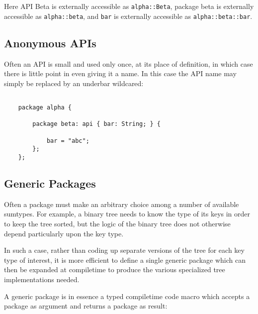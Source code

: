 Here API Beta is externally accessible as {\tt alpha::Beta}, 
package beta is externally accessible as {\tt alpha::beta}, 
and {\tt bar} is externally accessible as  {\tt alpha::beta::bar}.

\cutend*

\subsection{Anonymous APIs}
\label{section:ref:anonymous-apis}

Often an API is small and used only once, at its 
place of definition, in which case there is little 
point in even giving it a name.  In this case the 
API name may simply be replaced by an underbar 
wildcared:

\begin{verbatim}

    package alpha {

        package beta: api { bar: String; } {

            bar = "abc";
        };
    };

\end{verbatim}

\cutend*

\subsection{Generic Packages}
\label{section:ref:generic-packages}

Often a package must make an arbitrary choice among 
a number of available sumtypes.  For example, a 
binary tree needs to know the type of its keys in 
order to keep the tree sorted, but the logic of the 
binary tree does not otherwise depend particularly upon 
the key type. 

In such a case, rather than coding  up separate 
versions of the tree for each key type of interest, 
it is more efficient to define a single generic 
package which can then be expanded at compiletime 
to produce the various specialized tree implementations 
needed.

A generic package is in essence a typed compiletime 
code macro which accepts a package as argument and 
returns a package as result:

